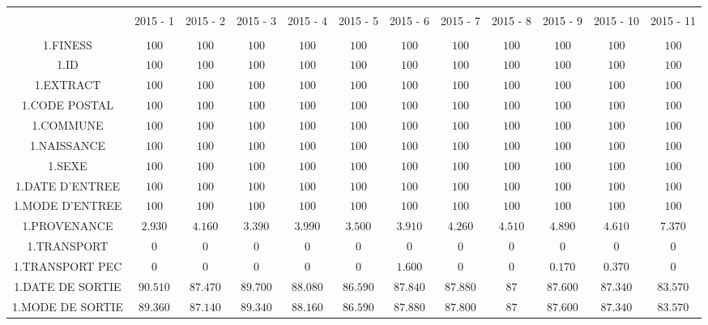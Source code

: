 \documentclass[]{article}
\begin{document}
\begin{table}[!htbp] \centering 
  \caption{} 
  \label{} 
\begin{tabular}{@{\extracolsep{5pt}} cccccccccccc} 
\\[-1.8ex]\hline 
\hline \\[-1.8ex] 
 & 2015 - 1 & 2015 - 2 & 2015 - 3 & 2015 - 4 & 2015 - 5 & 2015 - 6 & 2015 - 7 & 2015 - 8 & 2015 - 9 & 2015 - 10 & 2015 - 11 \\ 
\hline \\[-1.8ex] 
1.FINESS & $100$ & $100$ & $100$ & $100$ & $100$ & $100$ & $100$ & $100$ & $100$ & $100$ & $100$ \\ 
1.ID & $100$ & $100$ & $100$ & $100$ & $100$ & $100$ & $100$ & $100$ & $100$ & $100$ & $100$ \\ 
1.EXTRACT & $100$ & $100$ & $100$ & $100$ & $100$ & $100$ & $100$ & $100$ & $100$ & $100$ & $100$ \\ 
1.CODE POSTAL & $100$ & $100$ & $100$ & $100$ & $100$ & $100$ & $100$ & $100$ & $100$ & $100$ & $100$ \\ 
1.COMMUNE & $100$ & $100$ & $100$ & $100$ & $100$ & $100$ & $100$ & $100$ & $100$ & $100$ & $100$ \\ 
1.NAISSANCE & $100$ & $100$ & $100$ & $100$ & $100$ & $100$ & $100$ & $100$ & $100$ & $100$ & $100$ \\ 
1.SEXE & $100$ & $100$ & $100$ & $100$ & $100$ & $100$ & $100$ & $100$ & $100$ & $100$ & $100$ \\ 
1.DATE D'ENTREE & $100$ & $100$ & $100$ & $100$ & $100$ & $100$ & $100$ & $100$ & $100$ & $100$ & $100$ \\ 
1.MODE D'ENTREE & $100$ & $100$ & $100$ & $100$ & $100$ & $100$ & $100$ & $100$ & $100$ & $100$ & $100$ \\ 
1.PROVENANCE & $2.930$ & $4.160$ & $3.390$ & $3.990$ & $3.500$ & $3.910$ & $4.260$ & $4.510$ & $4.890$ & $4.610$ & $7.370$ \\ 
1.TRANSPORT & $0$ & $0$ & $0$ & $0$ & $0$ & $0$ & $0$ & $0$ & $0$ & $0$ & $0$ \\ 
1.TRANSPORT PEC & $0$ & $0$ & $0$ & $0$ & $0$ & $1.600$ & $0$ & $0$ & $0.170$ & $0.370$ & $0$ \\ 
1.DATE DE SORTIE & $90.510$ & $87.470$ & $89.700$ & $88.080$ & $86.590$ & $87.840$ & $87.880$ & $87$ & $87.600$ & $87.340$ & $83.570$ \\ 
1.MODE DE SORTIE & $89.360$ & $87.140$ & $89.340$ & $88.160$ & $86.590$ & $87.880$ & $87.800$ & $87$ & $87.600$ & $87.340$ & $83.570$ \\ 

\end{tabular}
\end{table}
\end{document}
